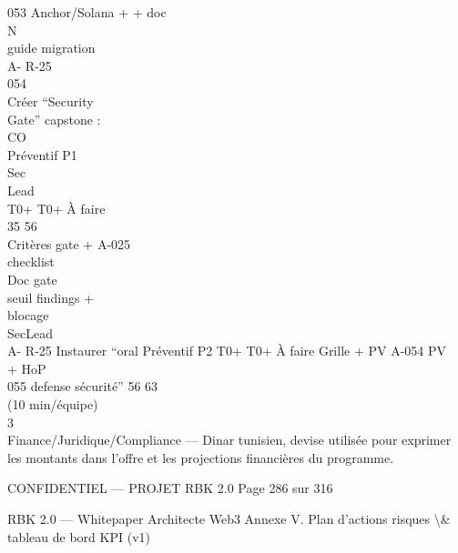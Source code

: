 053         Anchor/Solana +                                                         + doc\\
\vspace{0.5em}
\vspace{0.5em}
\vspace{0.5em}
\vspace{0.5em}
N\\
guide migration\\
\vspace{0.5em}
A- R-25\\
054\\
Créer “Security\\
Gate” capstone :\\
CO\\
Préventif P1\\
Sec\\
Lead\\
T0+ T0+ À faire\\
35    56\\
Critères gate + A-025\\
checklist\\
Doc gate\\
\vspace{0.5em}
seuil findings +\\
blocage\\
SecLead\\
A- R-25     Instaurer “oral        Préventif P2               T0+ T0+ À faire       Grille + PV    A-054    PV\\
+ HoP\\
055         defense sécurité”                                 56    63\\
(10 min/équipe)\\
\vspace{0.5em}
\vspace{0.5em}
\vspace{0.5em}
\vspace{0.5em}
3\\
Finance/Juridique/Compliance — Dinar tunisien, devise utilisée pour exprimer les montants dans l’offre et les projections financières du programme.\\
\vspace{0.5em}
\vspace{0.5em}
\begin{confidential}CONFIDENTIEL — PROJET RBK 2.0                                                  Page 286 sur 316\end{confidential}
RBK 2.0 — Whitepaper Architecte Web3                                                                              Annexe V. Plan d’actions risques \textbackslash{}& tableau de bord KPI (v1)\\
